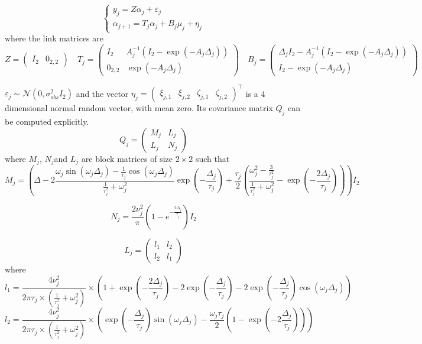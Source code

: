 \documentclass[11pt]{article}
\newcommand {\1}{\mathbb{1}}
\begin{document}
\[
\left\{
\begin{array}{l}
	y_j=Z\alpha_j+\varepsilon_j \\
	\alpha_{j+1}=T_j \alpha_j+B_j \mu_j + \eta_j
\end{array}
\right.\]
where the link matrices are 
\[Z=\begin{pmatrix} I_2 & 0_{2,2}\end{pmatrix} \quad  T_j=\begin{pmatrix} I_2 & A_j^{-1}(I_2-\exp(-A_j \Delta_j)) \\ 0_{2,2} & \exp(-A_j \Delta_j) \end{pmatrix} \quad B_j=\begin{pmatrix}
	\Delta_j I_2-A_j^{-1}(I_2-\exp(-A_j\Delta_j)) \\
	I_2-\exp(-A_j\Delta_j)\end{pmatrix}
\]


$\varepsilon_j \sim \mathcal{N}(0,\sigma_{obs}^2 I_2)$ and the vector $\eta_j=\begin{pmatrix} \xi_{j,1} & \xi_{j,2} & \zeta_{j,1} & \zeta_{j,2} \end{pmatrix}^\top$ is a 4 dimensional normal random vector, with mean zero. Its covariance matrix $Q_j$ can be computed explicitly.
\begin{equation}
	Q_j=\begin{pmatrix}
		M_j & L_j \\
		L_j & N_j
	\end{pmatrix}
	\label{eq: state space covariance}
\end{equation}
where $M_j$, $N_j$and $L_j$ are block matrices of size $2 \times 2$ such that 
\[M_j=\left( \Delta-2 \frac{\omega_j \sin(\omega_j \Delta_j)-\frac{1}{\tau_j} \cos(\omega_j \Delta_j)}{\frac{1}{\tau_j^2}+\omega_j^2 } \exp\left( -\frac{\Delta_j}{\tau_j} \right) +\frac{\tau_j}{2} \left( \frac{\omega_j^2-\frac{3}{\tau_j^2}}{\frac{1}{\tau_j^2}+\omega_j^2}-\exp\left( -\frac{2\Delta_j}{\tau_j}\right)\right) \right)I_2\]

\[N_j=\frac{2\nu_j^2}{\pi}\left(1-e^{-\frac{2 \Delta_j}{\tau_j}}\right)I_2\]

\[L_j=\begin{pmatrix} l_1 & l_2 \\
	l_2 & l_1\end{pmatrix}\]
where 
\[l_1=\frac{4\nu_j^2}{2 \pi \tau_j \times \left( \frac{1}{\tau_j^2}+\omega_j^2\right)} \times \left( 1+\exp\left( -\frac{2\Delta_j}{\tau_j}\right)-2\exp\left( -\frac{\Delta_j}{\tau_j}\right)-2\exp\left( -\frac{\Delta_j}{\tau_j}\right) \cos(\omega_j \Delta_j)\right)\]
\[l_2=\frac{4\nu_j^2}{2 \pi \tau_j \times \left( \frac{1}{\tau_j^2}+\omega_j^2\right)} \times\left( \exp\left( -\frac{\Delta_j}{\tau_j}\right) \sin(\omega_j \Delta_j)-\frac{\omega_j \tau_j}{2} \left(1-\exp\left( -2 \frac{\Delta_j}{\tau_j}\right) \right)\right)\]
\end{document}
